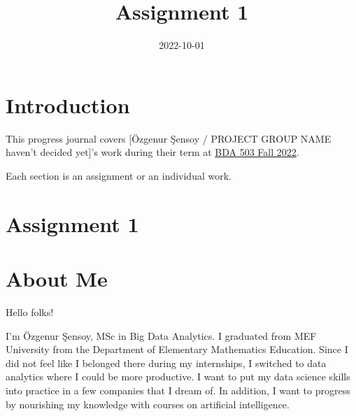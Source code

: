 \documentclass[
  letterpaper,
  DIV=11,
  numbers=noendperiod]{scrreprt}
\title{Assignment 1}
\author{}
\date{2022-10-01}
\renewcommand*\contentsname{Table of contents}
\newcommand\contentsname{Table of contents}
\begin{document}
\maketitle
\ifdefined\Shaded\renewenvironment{Shaded}{\begin{tcolorbox}[interior hidden, frame hidden, sharp corners, breakable, enhanced, boxrule=0pt, borderline west={3pt}{0pt}{shadecolor}]}{\end{tcolorbox}}\fi

\renewcommand*\contentsname{Table of contents}
{
\hypersetup{linkcolor=}
\setcounter{tocdepth}{2}
\tableofcontents
}

\hypertarget{introduction}{%
\chapter*{Introduction}\label{introduction}}


This progress journal covers {[}Özgenur Şensoy / PROJECT GROUP NAME
haven't decided yet{]}'s work during their term at
\href{https://mef-bda503.github.io/fall22/}{BDA 503 Fall 2022}.

Each section is an assignment or an individual work.


\hypertarget{assignment-1}{%
\chapter{Assignment 1}\label{assignment-1}}


\hypertarget{about-me}{%
\chapter{\textbar{} About Me}\label{about-me}}

{Hello folks!}

I'm Özgenur Şensoy, MSc in Big Data Analytics. I graduated from MEF
University from the Department of Elementary Mathematics Education.
Since I did not feel like I belonged there during my internships, I
switched to data analytics where I could be more productive. I want to
put my data science skills into practice in a few companies that I dream
of. In addition, I want to progress by nourishing my knowledge with
courses on artificial intelligence.
\end{document}
